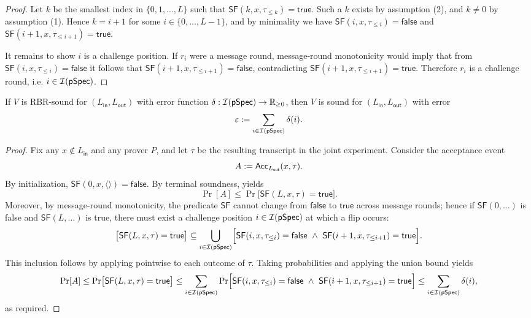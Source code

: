 \begin{proof}
Let $k$ be the smallest index in $\{0,1,\dots,L\}$ such that $\mathsf{SF}(k,x,\tau_{\le k})=\mathsf{true}$.
Such a $k$ exists by assumption (2), and $k \neq 0$ by assumption (1). Hence $k=i+1$ for some
$i \in \{0,\dots,L-1\}$, and by minimality we have $\mathsf{SF}(i,x,\tau_{\le i})=\mathsf{false}$ and
$\mathsf{SF}(i+1,x,\tau_{\le i+1})=\mathsf{true}$.

It remains to show $i$ is a challenge position. If $r_i$ were a message round, message-round
monotonicity would imply that from $\mathsf{SF}(i,x,\tau_{\le i})=\mathsf{false}$ it follows that
$\mathsf{SF}(i+1,x,\tau_{\le i+1})=\mathsf{false}$, contradicting
$\mathsf{SF}(i+1,x,\tau_{\le i+1})=\mathsf{true}$. Therefore $r_i$ is a challenge round, i.e.
$i\in\mathcal{I}(\mathsf{pSpec})$.
\end{proof}

\begin{theorem}
\label{thm:rbr_soundness_implies_soundness_list}
If $V$ is RBR-sound for $(L_{\mathsf{in}},L_{\mathsf{out}})$ with error function
$\delta : \mathcal{I}(\mathsf{pSpec}) \to \mathbb{R}_{\ge 0}$, then $V$ is sound for
$(L_{\mathsf{in}},L_{\mathsf{out}})$ with error
\[
  \varepsilon \mathrel{:=} \sum_{i \in \mathcal{I}(\mathsf{pSpec})} \delta(i).
\]
\end{theorem}

\begin{proof}
Fix any $x \notin L_{\mathsf{in}}$ and any prover $P$, and let $\tau$ be the resulting transcript in
the joint experiment. Consider the acceptance event
\[
  A \mathrel{:=} \mathsf{Acc}_{L_{\mathsf{out}}}(x,\tau).
\]
By initialization, $\mathsf{SF}(0,x,\langle\rangle)=\mathsf{false}$. By terminal soundness,
 yields
\[
  \Pr[A] \le \Pr\bigl[\mathsf{SF}(L,x,\tau)=\mathsf{true}\bigr].
\]
Moreover, by message-round monotonicity, the predicate $\mathsf{SF}$ cannot change from
$\mathsf{false}$ to $\mathsf{true}$ across message rounds; hence if $\mathsf{SF}(0,\dots)$ is false
and $\mathsf{SF}(L,\dots)$ is true, there must exist a challenge position $i \in \mathcal{I}(\mathsf{pSpec})$
at which a flip occurs:
\[
  \bigl[\mathsf{SF}(L,x,\tau)=\mathsf{true}\bigr]
  \subseteq
  \bigcup_{i \in \mathcal{I}(\pSpec)}
  \Bigl[\mathsf{SF}(i,x,\tau_{\le i})=\mathsf{false}\ \wedge\ \mathsf{SF}(i+1,x,\tau_{\le i+1})=\mathsf{true}\Bigr].
\]
This inclusion follows by applying  pointwise to each outcome of
$\tau$.
Taking probabilities and applying the union bound yields
\[
  \Pr[A]
  \le \Pr\bigl[\mathsf{SF}(L,x,\tau)=\mathsf{true}\bigr]
  \le \sum_{i \in \mathcal{I}(\pSpec)}
  \Pr\Bigl[\mathsf{SF}(i,x,\tau_{\le i})=\mathsf{false}\ \wedge\ \mathsf{SF}(i+1,x,\tau_{\le i+1})=\mathsf{true}\Bigr]
  \le
  \sum_{i \in \mathcal{I}(\pSpec)} \delta(i),
\]
as required.
\end{proof}

